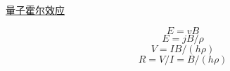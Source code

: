 
\begin{issues}
\issueDraft
\end{issues}

\href{https://en.wikipedia.org/wiki/Fractional_quantum_Hall_effect}{量子霍尔效应}

\begin{equation}
E = vB
\end{equation}
\begin{equation}
E = jB/\rho
\end{equation}
\begin{equation}
V = IB/(h\rho)
\end{equation}
\begin{equation}
R = V/I = B/(h\rho)
\end{equation}
